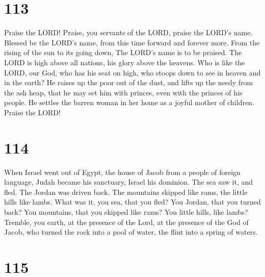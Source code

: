 \hypertarget{section-105}{%
\section{113}\label{section-105}}

 Praise the LORD! Praise, you servants of the LORD, praise
the LORD's name.  Blessed be the LORD's name, from this time
forward and forever more.  From the rising of the sun to its
going down, The LORD's name is to be praised.  The LORD is
high above all nations, his glory above the heavens.  Who is
like the LORD, our God, who has his seat on high,  who
stoops down to see in heaven and in the earth?  He raises up
the poor out of the dust, and lifts up the needy from the ash heap,
 that he may set him with princes, even with the princes of
his people.  He settles the barren woman in her home as a
joyful mother of children. Praise the LORD!

\hypertarget{section-106}{%
\section{114}\label{section-106}}

 When Israel went out of Egypt, the house of Jacob from a
people of foreign language,  Judah became his sanctuary,
Israel his dominion.  The sea saw it, and fled. The Jordan
was driven back.  The mountains skipped like rams, the
little hills like lambs.  What was it, you sea, that you
fled? You Jordan, that you turned back?  You mountains, that
you skipped like rams? You little hills, like lambs? 
Tremble, you earth, at the presence of the Lord, at the presence of the
God of Jacob,  who turned the rock into a pool of water, the
flint into a spring of waters.

\hypertarget{section-107}{%
\section{115}\label{section-107}}

